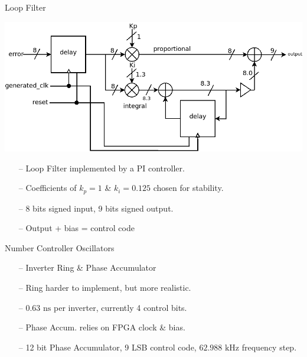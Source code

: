 \documentclass{beamer}
\begin{document}
\begin{frame}{Loop Filter}
    \vspace{-0.67 cm}
 	\begin{center}
        \includegraphics[scale=0.325]{../loop_filter.png}
 	\end{center}	
	\begin{itemize}
		\item[--]
            Loop Filter implemented by a PI controller.
        \item[--]
            Coefficients of $k_p=1$ \& $k_i=0.125$ chosen for stability. \cite{pid_coeffs}
        \item[--]
        	8 bits signed input, 9 bits signed output.
        \item[--]
        	Output + bias = control code
    \end{itemize}
\end{frame}

\begin{frame}{Number Controller Oscillators}
	\begin{itemize}
		\item[--]
            Inverter Ring \& Phase Accumulator
        \item[--]
            Ring harder to implement, but more realistic.
        \item[--]
            $0.63\textrm{ ns}$ per inverter, currently 4 control bits.
        \item[--]
        	Phase Accum. relies on FPGA clock \& bias.
        \item[--]
        	12 bit Phase Accumulator, 9 LSB control code, $62.988\textrm{ kHz}$ frequency step.
    \end{itemize}
\end{frame}
\end{document}
